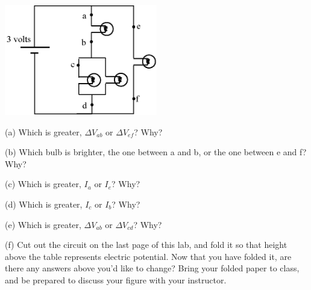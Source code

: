 \begin{center}
\includegraphics[width=0.5\textwidth]{electric_circuits/circ_diag7.eps}
\end{center}
\vspace{-0.1in}

(a) Which is greater, $\Delta V_{ab}$ or  $\Delta V_{ef}$?  Why?
\vspace{0.6 in}

(b) Which bulb is brighter, the one between a and b, or the one between e and f?  Why?
\vspace{0.6 in}

(c) Which is greater, $I_a$ or $I_e$?  Why?
\vspace{0.6 in}

(d) Which is greater, $I_c$ or $I_b$? Why?
\vspace{0.6 in}

(e) Which is greater, $\Delta V_{ab}$ or  $\Delta V_{cd}$? Why?
\vspace{0.6 in}

(f) Cut out the circuit on the last page of this lab, and fold it so that height above the table represents electric potential.  Now that you have folded it, are there any answers above you’d like to change?  Bring your folded paper to class, and be prepared to discuss your figure with your instructor.
\vspace{0.6 in}


